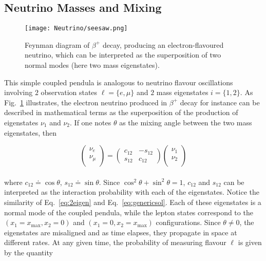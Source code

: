 \subsection{Neutrino Masses and Mixing}
\label{sec:numassmix}

\begin{figure}
\begin{center}
\texttt{[image: Neutrino/seesaw.png]}
\caption{Feynman diagram of $\beta^{+}$ decay, producing an electron-flavoured neutrino, which can be interpreted as the superposition of two normal modes (here two mass eigenstates).}
\label{fig:mixing}
\end{center}
\end{figure}

This simple coupled pendula is analogous to neutrino flavour oscillations involving $2$ observation states $\ell = \lbrace e, \mu \rbrace$ and $2$ mass eigenstates $i = \lbrace 1, 2 \rbrace$. As Fig.~\ref{fig:mixing} illustrates, the electron neutrino produced in $\beta^{+}$ decay for instance can be described in mathematical terms as the superposition of the production of eigenstates $\nu_1$ and $\nu_2$. If one notes $\theta$ as the mixing angle between the two mass eigenstates, then 

\begin{equation}
\label{eq:2eigen}
\left( 
\begin{array}{c}
\nu_e \\
\nu_\mu \\
\end{array}
\right) = \left(
\begin{array}{cc}
c_{12} & - s_{12} \\
s_{12} & c_{12}
\end{array}
\right)
\left( 
\begin{array}{c}
\nu_1 \\
\nu_2 \\
\end{array}
\right)
\end{equation} \\ where $c_{12} \doteq \cos \theta$, $s_{12} \doteq \sin \theta$. Since $\cos^2 \theta + \sin^2 \theta = 1$, $c_{12}$ and $s_{12}$ can be interpreted as the interaction probability with each of the eigenstates. Notice the similarity of Eq.~\ref{eq:2eigen} and Eq.~\ref{eq:genericsol}. Each of these eigenstates is a normal mode of the coupled pendula, while the lepton states correspond to the $(x_1 = x_{\mathrm{max}}, x_2=0)$ and $(x_1 = 0, x_2 = x_{\mathrm{max}})$ configurations. Since $\theta \neq 0$, the eigenstates are misaligned and as time elapses, they propagate in space at different rates. At any given time, the probability of measuring flavour $\ell$ is given by the quantity

